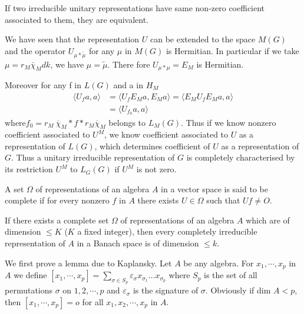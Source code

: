 \setcounter{theorem}{0}
\begin{theorem}\label{part2:chap1:sec2:thm1}
  If two irreducible unitary representations have same non-zero
  coefficient associated to them, they are equivalent. 
  
  We have seen that the representation $U$ can be extended to the
  space $ M(G)$  and the operator $U_{\mu *\tilde{\mu}}$ for any $\mu$
  in $M(G)$ is Hermitian. In particular if we take $\mu=r_M
  \bar{\chi}_M dk$, we have $\mu=\tilde{\mu}$. There fore
  $U_{\mu*\mu}=E_M$ is Hermitian. 
\end{theorem} 
        
Moreover for any f in $ L(G)$ and a in $H_M$
\begin{align*}
  \langle U_f a,a \rangle &=\langle U_fE_Ma,E_Ma \rangle =\langle
  E_MU_fE_Ma,a \rangle \\ 
  &=\langle U_{f_0}a,a \rangle
\end{align*}   
where\pageoriginale $f_0=r_M ~\overline{\chi}_M *f*r_M \overline {\chi}_M$ belongs to
$L_M(G)$. Thus if we know nonzero coefficient associated to $U^M$, we
know coefficient associated to $U$ as a representation of $L(G)$,
which determines coefficient of $U$ as a representation of $G$. Thus a
unitary irreducible representation of $G$ is completely characterised
by its restriction $U^M$ to $L_G(G)$ if $U^M$ is not zero. 
    
\begin{defi*}
  A set $\Omega$ of representations of an algebra $A$ in a vector space
  is said to be complete if for every nonzero $f$ in $A$ there exists
  $U \in \Omega$ such that $Uf \neq O$. 
\end{defi*} 
      
\begin{proposition}\label{part2:chap1:sec2:prop3}
  If there exists a complete set $\Omega$ of representations of an
  algebra $A$ which are of dimension $\le K$ ($K$ a fixed integer), then
  every completely irreducible representation of $A$ in a Banach space
  is of dimension $\le k$. 
\end{proposition}   
           
We first prove a lemma due to Kaplansky. Let $A$ be any algebra. For
$x_1,\cdots,x_p$ in $A$ we define $[x_1, \cdots, x_p]=\sum
\limits_{\sigma \in S_p} \varepsilon_\sigma x_{\sigma_1} \ldots
x_{\sigma_p}$ where $S_p$ is the set 
of all permutations $\sigma$ on $1,2,\cdots, p$ and $\varepsilon_\sigma$ is
the signature of $\sigma$. Obviously if dim $A < p$, then
$[x_1,\cdots,x_p]=o$ for all $x_1,x_2,\cdots, x_p$ in $A$. 
           
